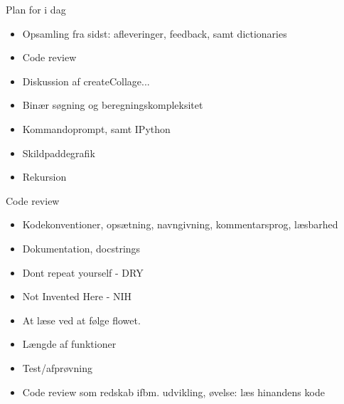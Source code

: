 \documentclass[a4paper,landscape]{slides}
\begin{document}
\begin{slide}
	\begin{center} {\large 
            Plan for i dag
	} \end{center}
	\begin{itemize} \addtolength{\itemsep}{-\baselineskip}
		\item Opsamling fra sidst: afleveringer, feedback, samt dictionaries
                \item Code review
		\item Diskussion af createCollage...
                \item Binær søgning og beregningskompleksitet
		\item Kommandoprompt, samt IPython
		\item Skildpaddegrafik 
                \item Rekursion
	\end{itemize}
\end{slide}


\begin{slide}
	\begin{center} {\large 
            Code review
	} \end{center}
	\begin{itemize} \addtolength{\itemsep}{-\baselineskip}
                \item Kodekonventioner, opsætning, navngivning, kommentarsprog, læsbarhed
                \item Dokumentation, docstrings
                \item Dont repeat yourself - DRY
                \item Not Invented Here - NIH
                \item At læse ved at følge flowet.
                \item Længde af funktioner
                \item Test/afprøvning
                \item Code review som redskab ifbm. udvikling, øvelse: læs hinandens kode
	\end{itemize}
\end{slide}
\end{document}

